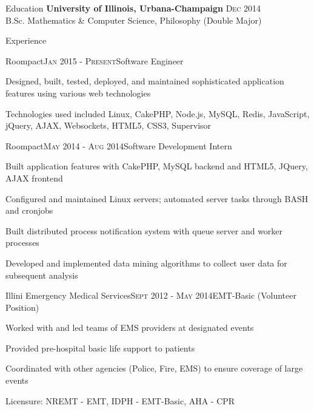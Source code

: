 \documentclass{resume} %
\begin{document}

\begin{rSection}{Education}
{\bf University of Illinois, Urbana-Champaign} \hfill { \textsc{Dec 2014}} \\ 
B.Sc. Mathematics \& Computer Science, Philosophy (Double Major)
\end{rSection}


\begin{rSection}{Experience}
\begin{rSubsection}{Roompact}{\textsc{Jan 2015 - Present}}{Software Engineer}{}
\item Designed, built, tested, deployed, and maintained sophisticated application features using various web technologies
\item Technologies used included Linux, CakePHP, Node.js, MySQL, Redis, JavaScript, jQuery, AJAX, Websockets, HTML5, CSS3, Supervisor
\end{rSubsection}


\begin{rSubsection}{Roompact}{\textsc{May 2014 - Aug 2014}}{Software Development Intern}{}
\item Built application features with CakePHP, MySQL backend and HTML5, JQuery, AJAX frontend
\item Configured and maintained Linux servers; automated server tasks through BASH and cronjobs
\item Built distributed process notification system with queue server and worker processes
\item Developed and implemented data mining algorithms to collect user data for subsequent analysis
\end{rSubsection}


\begin{rSubsection}{Illini Emergency Medical Services}{\textsc{Sept 2012 - May 2014}}{EMT-Basic (Volunteer Position)}{}
\item Worked with and led teams of EMS providers at designated events
\item Provided pre-hospital basic life support to patients
\item Coordinated with other agencies (Police, Fire, EMS) to ensure coverage of large events
\item Licensure: NREMT - EMT, IDPH - EMT-Basic, AHA - CPR
\end{rSubsection}


\end{rSection}
\end{document}
